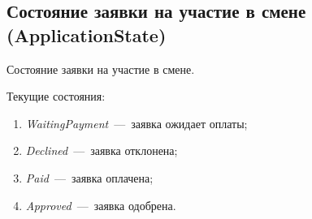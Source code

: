 \documentclass[14pt]{article}
\begin{document}
\subsection{Состояние заявки на участие в смене (ApplicationState)}

Состояние заявки на участие в смене.

Текущие состояния:

\begin{enumerate}
	\item \emph{WaitingPayment}~---~заявка ожидает оплаты;
	\item \emph{Declined}~---~заявка отклонена;
	\item \emph{Paid}~---~заявка оплачена;
	\item \emph{Approved}~---~заявка одобрена.
\end{enumerate}
\end{document}

